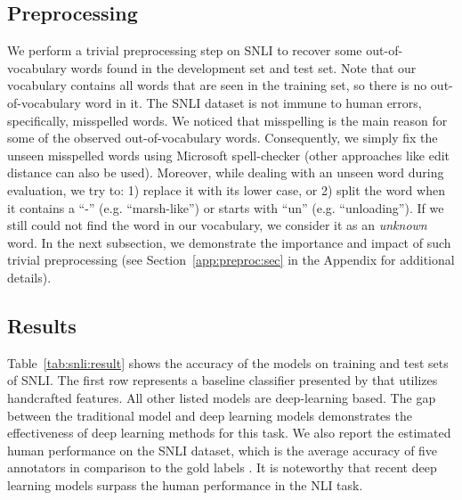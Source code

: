 \documentclass[11pt,a4paper]{article}
\begin{document}
	\subsection{Preprocessing}
	We perform a trivial preprocessing step on SNLI to recover some out-of-vocabulary words found in the development set and test set. Note that our vocabulary contains all words that are seen in the training set, so there is no out-of-vocabulary word in it. The SNLI dataset is not immune to human errors, specifically, misspelled words. We noticed that misspelling is the main reason for some of the observed out-of-vocabulary words. Consequently, we simply fix the unseen misspelled words using Microsoft spell-checker (other approaches like edit distance can also be used). Moreover, while dealing with an unseen word during evaluation, we try to: 1) replace it with its lower case, or 2) split the word when it contains a ``-'' (e.g. ``marsh-like'') or starts with ``un'' (e.g. ``unloading''). If we still could not find the word in our vocabulary, we consider it as an \emph{unknown} word. In the next subsection, we demonstrate the importance and impact of such trivial preprocessing (see Section~\ref{app:preproc:sec} in the Appendix for additional details).
	
	\subsection{Results}	
	
	\noindent Table~\ref{tab:snli:result} shows the accuracy of the models on training and test sets of SNLI. The first row represents a baseline classifier presented by \citet{snli} that utilizes handcrafted features. All other listed models are deep-learning based. The gap between the traditional model and deep learning models demonstrates the effectiveness of deep learning methods for this task. We also report the estimated human performance on the SNLI dataset, which is the average accuracy of five annotators in comparison to the gold labels \cite{gong2017}. It is noteworthy that recent deep learning models surpass the human performance in the NLI task.
	
\end{document}
